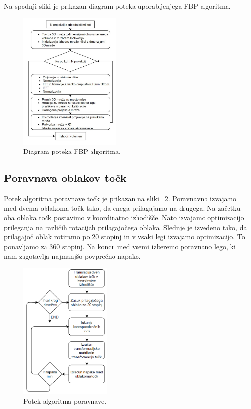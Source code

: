 \documentclass[journal,a4paper,twoside]{sty/IEEEtran}
\begin{document}
Na spodnji sliki je prikazan diagram poteka uporabljenjega FBP algoritma.

\begin{figure}[H]
	\centerline{\includegraphics[width=5cm]{fig/FBPflow}}
	\caption{Diagram poteka FBP algoritma.}
	\label{fig:fbp_flow}
\end{figure}

\subsection{Poravnava oblakov točk}
%
Potek algoritma poravnave točk je prikazan na sliki ~\ref{fig:alg_poravnava}. Poravnavno izvajamo med dvema oblakoma točk tako, da enega prilagajamo na drugega. Na začetku oba oblaka točk postavimo v koordinatno izhodišče. Nato izvajamo optimizacijo prileganja na različih rotacijah prilagajočega oblaka. Slednje je izvedeno tako, da prilagajoč oblak rotiramo po 20 stopinj in v vsaki legi izvajamo optimizacijo. To ponavljamo za 360 stopinj. Na koncu med vsemi izberemo poravnano lego, ki nam zagotavlja najmanjšo povprečno napako. 

\begin{figure}[H]
	\centerline{\includegraphics[width=4.5cm]{fig/alg_poravnava}}
	\caption{Potek algoritma poravnave.}
	\label{fig:alg_poravnava}
\end{figure}
\end{document}
